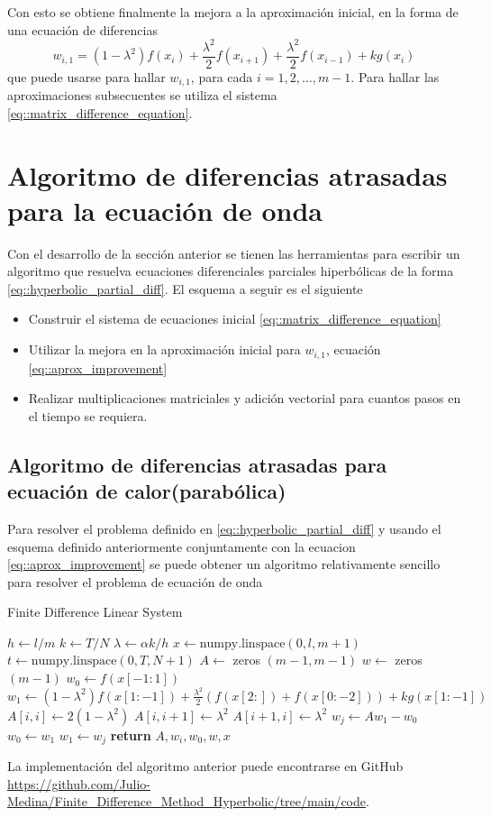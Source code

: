 \documentclass[a4paper]{article}
\begin{document}
Con esto se obtiene finalmente la mejora a la aproximación inicial, en la forma de una ecuación de diferencias
\begin{equation}\label{eq::aprox_improvement}
w_{i,1}=(1-\lambda^2)f(x_i)+\frac{\lambda^2}{2}f(x_{i+1})+\frac{\lambda^2}{2}f(x_{i-1})+kg(x_i)
\end{equation}
que puede usarse para hallar $w_{i,1}$, para cada $i=1,2,\hdots, m-1$. Para hallar las aproximaciones subsecuentes se utiliza el sistema \ref{eq::matrix_difference_equation}.

\section{Algoritmo de diferencias atrasadas para la ecuación de onda}
Con el desarrollo de la sección anterior se tienen las herramientas para escribir un algoritmo que resuelva ecuaciones diferenciales parciales hiperbólicas de la forma \ref{eq::hyperbolic_partial_diff}. El esquema a seguir es el siguiente
\begin{itemize}
\item Construir el sistema de ecuaciones inicial \ref{eq::matrix_difference_equation}
\item Utilizar la mejora en la aproximación inicial para $w_{i,1}$, ecuación \ref{eq::aprox_improvement}
\item Realizar multiplicaciones matriciales y adición vectorial para cuantos pasos en el tiempo se requiera.
\end{itemize}
\subsection{Algoritmo de diferencias atrasadas para ecuación de calor(parabólica)}
Para resolver el problema definido en \ref{eq::hyperbolic_partial_diff} y usando el esquema definido anteriormente conjuntamente con la ecuacion \ref{eq::aprox_improvement} se puede obtener un algoritmo relativamente sencillo para resolver el problema de ecuación de onda
\begin{algorithm}[H]
\caption{Finite Difference Linear System}\label{alg::fininte_difference_hyperbolic}
\begin{algorithmic}[H]
\State $h \gets l/m$
\State $k \gets T/N$
\State $\lambda \gets \alpha k /h$
\State $x\gets \text{numpy.linspace}(0, l, m+1)$
\State $t \gets \text{numpy.linspace}(0, T, N+1)$
\State $A \gets$ zeros $(m-1,m-1)$
\State $w \gets$ zeros $(m-1)$
\State $w_0\gets f(x[-1:1])$
\State $w_1 \gets (1-\lambda^2)f(x[1:-1])+\frac{\lambda^2}{2}(f(x[2:])+f(x[0:-2]))+kg(x[1:-1])$
\State $A[i,i]\gets 2(1-\lambda^2)$
\State $A[i,i+1]\gets \lambda^2$
\State $A[i+1,i]\gets\lambda^2$
\EndIf
\EndFor
{}
\State $w_j\gets A w_1-w_0$
\State $w_0\gets w_1$
\State $w_1\gets w_j$
\EndFor
\State \textbf{return} $A, w_i,w_0,w,x$
\EndFunction
\end{algorithmic}
\end{algorithm}
La implementación del algoritmo anterior puede encontrarse en GitHub \url{https://github.com/Julio-Medina/Finite_Difference_Method_Hyperbolic/tree/main/code}.
\end{document}
